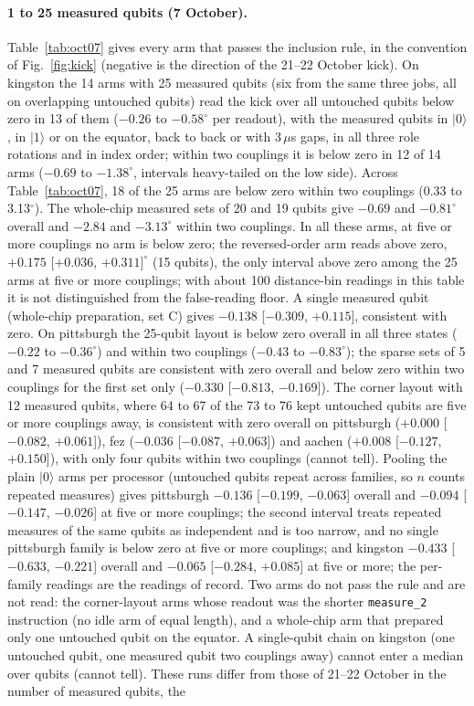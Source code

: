 \documentclass[reprint,amsmath,amssymb,aps,superscriptaddress,nofootinbib]{revtex4-2}
\newcommand{\us}{\,$\mu$s}
\begin{document}
\paragraph*{1 to 25 measured qubits (7 October).} Table~\ref{tab:oct07} gives every arm that passes the inclusion rule, in the convention of Fig.~\ref{fig:kick} (negative is the direction of the 21--22 October kick). On kingston the 14 arms with 25 measured qubits (six from the same three jobs, all on overlapping untouched qubits) read the kick over all untouched qubits below zero in 13 of them ($-0.26$ to $-0.58^\circ$ per readout), with the measured qubits in $|0\rangle$, in $|1\rangle$ or on the equator, back to back or with 3\us{} gaps, in all three role rotations and in index order; within two couplings it is below zero in 12 of 14 arms ($-0.69$ to $-1.38^\circ$, intervals heavy-tailed on the low side). Across Table~\ref{tab:oct07}, 18 of the 25 arms are below zero within two couplings (0.33 to 3.13$^\circ$). The whole-chip measured sets of 20 and 19 qubits give $-0.69$ and $-0.81^\circ$ overall and $-2.84$ and $-3.13^\circ$ within two couplings. In all these arms, at five or more couplings no arm is below zero; the reversed-order arm reads above zero, $+0.175$ [$+0.036$, $+0.311]^\circ$ (15 qubits), the only interval above zero among the 25 arms at five or more couplings; with about 100 distance-bin readings in this table it is not distinguished from the false-reading floor. A single measured qubit (whole-chip preparation, set C) gives $-0.138$ [$-0.309$, $+0.115$], consistent with zero. On pittsburgh the 25-qubit layout is below zero overall in all three states ($-0.22$ to $-0.36^\circ$) and within two couplings ($-0.43$ to $-0.83^\circ$); the sparse sets of 5 and 7 measured qubits are consistent with zero overall and below zero within two couplings for the first set only ($-0.330$ [$-0.813$, $-0.169$]). The corner layout with 12 measured qubits, where 64 to 67 of the 73 to 76 kept untouched qubits are five or more couplings away, is consistent with zero overall on pittsburgh ($+0.000$ [$-0.082$, $+0.061$]), fez ($-0.036$ [$-0.087$, $+0.063$]) and aachen ($+0.008$ [$-0.127$, $+0.150$]), with only four qubits within two couplings (cannot tell). Pooling the plain $|0\rangle$ arms per processor (untouched qubits repeat across families, so $n$ counts repeated measures) gives pittsburgh $-0.136$ [$-0.199$, $-0.063$] overall and $-0.094$ [$-0.147$, $-0.026$] at five or more couplings; the second interval treats repeated measures of the same qubits as independent and is too narrow, and no single pittsburgh family is below zero at five or more couplings; and kingston $-0.433$ [$-0.633$, $-0.221$] overall and $-0.065$ [$-0.284$, $+0.085$] at five or more; the per-family readings are the readings of record. Two arms do not pass the rule and are not read: the corner-layout arms whose readout was the shorter \texttt{measure\_2} instruction (no idle arm of equal length), and a whole-chip arm that prepared only one untouched qubit on the equator. A single-qubit chain on kingston (one untouched qubit, one measured qubit two couplings away) cannot enter a median over qubits (cannot tell). These runs differ from those of 21--22 October in the number of measured qubits, the 
\end{document}
